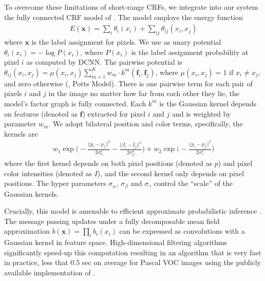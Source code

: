 To overcome these limitations of short-range CRFs, we integrate into our system
the fully connected CRF model of \citet{krahenbuhl2011efficient}.
The model employs the energy function
\begin{align}
  E(\boldsymbol{x}) = \sum_i \theta_i(x_i) + \sum_{ij} \theta_{ij}(x_i, x_j)
\end{align}
where $\boldsymbol{x}$ is the label assignment for pixels. We use as unary
potential $\theta_i(x_i) = - \log P(x_i)$, where $P(x_i)$ is the label
assignment probability at pixel $i$ as computed by DCNN. The pairwise
potential is $\theta_{ij}(x_i, x_j) = \mu(x_i,x_j)\sum_{m=1}^{K} w_m \cdot
k^m(\boldsymbol{f}_i, \boldsymbol{f}_j)$, where $\mu(x_i,x_j)=1 \text{ if } x_i \neq x_j$, and zero otherwise (\ie, Potts Model). There is one pairwise term for each
pair of pixels $i$ and $j$ in the image no matter how far from each other they
lie, \ie the model's factor graph is fully connected. Each $k^m$ is the
Gaussian kernel depends on features (denoted as $\boldsymbol{f}$) extracted for pixel $i$ and $j$ and is
weighted by parameter $w_m$. We adopt bilateral position and color terms,
specifically, the kernels are
\begin{align}
  \label{eq:fully_crf}
  w_1 \exp \Big(-\frac{||p_i-p_j||^2}{2\sigma_\alpha^2} -\frac{||I_i-I_j||^2}{2\sigma_\beta^2} \Big) + w_2 \exp \Big(-\frac{||p_i-p_j||^2}{2\sigma_\gamma^2}\Big)
\end{align}
where the first kernel depends on both pixel positions (denoted as $p$) and
pixel color intensities (denoted as $I$), and the second kernel only depends
on pixel positions. The hyper parameters $\sigma_\alpha$, $\sigma_\beta$ and
$\sigma_\gamma$ control the ``scale'' of the Gaussian kernels.

Crucially, this model is amenable to efficient approximate probabilistic
inference \citep{krahenbuhl2011efficient}. The message passing updates under a
fully decomposable mean field approximation $b(\boldsymbol{x}) = \prod_i
b_i(x_i)$ can be expressed as convolutions with a Gaussian kernel in feature
space. High-dimensional filtering algorithms \citep{adams2010fast}
significantly speed-up this computation resulting in an algorithm that is very
fast in practice, less that 0.5 sec on average for Pascal VOC images using the
publicly available implementation of \citep{krahenbuhl2011efficient}.


